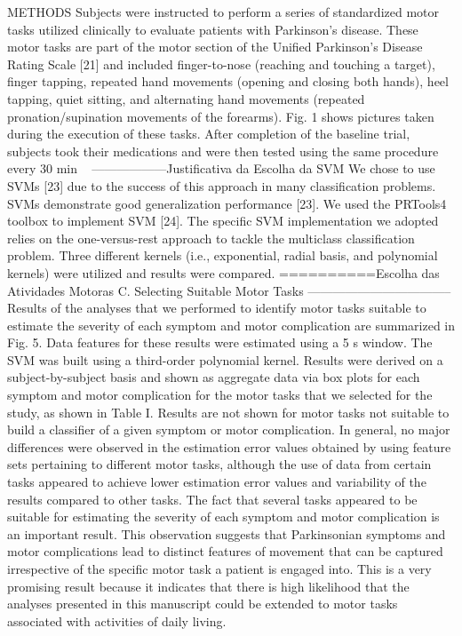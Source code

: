 METHODS
Subjects were instructed to perform a series of standardized
motor tasks utilized clinically to evaluate patients with Parkinson’s
disease. These motor tasks are part of the motor section of
the Unified Parkinson’s Disease Rating Scale [21] and included
finger-to-nose (reaching and touching a target), finger tapping,
repeated hand movements (opening and closing both hands),
heel tapping, quiet sitting, and alternating hand movements (repeated
pronation/supination movements of the forearms). Fig. 1
shows pictures taken during the execution of these tasks. After
completion of the baseline trial, subjects took their medications
and were then tested using the same procedure every 30 min
~\cite{patel_monitoring_2009}
------------------Justificativa da Escolha da SVM
We chose to use SVMs [23] due to the success of this approach in many classification problems. SVMs demonstrate good generalization performance [23]. We used the PRTools4 toolbox to implement SVM [24]. The specific SVM implementation we adopted relies on the one-versus-rest approach to tackle the multiclass classification problem. Three different kernels (i.e., exponential, radial basis, and polynomial kernels) were utilized and results were compared.
==========Escolha das Atividades Motoras
C. Selecting Suitable Motor Tasks
-----------------------------------
Results of the analyses that we performed to identify motor
tasks suitable to estimate the severity of each symptom and
motor complication are summarized in Fig. 5. Data features
for these results were estimated using a 5 s window. The SVM
was built using a third-order polynomial kernel. Results were
derived on a subject-by-subject basis and shown as aggregate
data via box plots for each symptom and motor complication
for the motor tasks that we selected for the study, as shown in Table I. Results are not shown for motor tasks not suitable to
build a classifier of a given symptom or motor complication.
In general, no major differences were observed in the estimation
error values obtained by using feature sets pertaining to
different motor tasks, although the use of data from certain tasks
appeared to achieve lower estimation error values and variability
of the results compared to other tasks. The fact that several
tasks appeared to be suitable for estimating the severity of each
symptom and motor complication is an important result. This
observation suggests that Parkinsonian symptoms and motor
complications lead to distinct features of movement that can be
captured irrespective of the specific motor task a patient is engaged
into. This is a very promising result because it indicates
that there is high likelihood that the analyses presented in this
manuscript could be extended to motor tasks associated with
activities of daily living.









